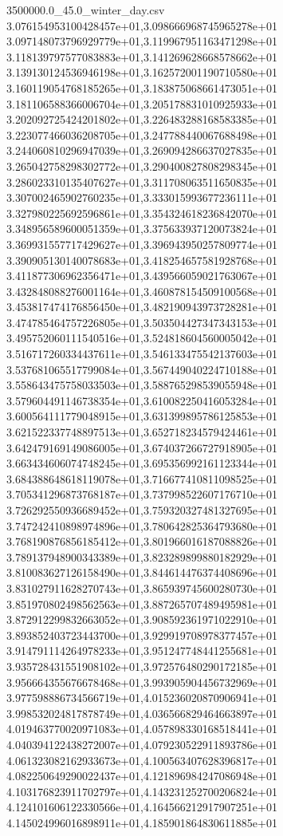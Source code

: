 \begin{filecontents*}{3500000.0_45.0_winter_day.csv}
3.076154953100428457e+01,3.098666968745965278e+01
3.097148073796929779e+01,3.119967951163471298e+01
3.118139797577083883e+01,3.141269628668578662e+01
3.139130124536946198e+01,3.162572001190710580e+01
3.160119054768185265e+01,3.183875068661473051e+01
3.181106588366006704e+01,3.205178831010925933e+01
3.202092725424201802e+01,3.226483288168583385e+01
3.223077466036208705e+01,3.247788440067688498e+01
3.244060810296947039e+01,3.269094286637027835e+01
3.265042758298302772e+01,3.290400827808298345e+01
3.286023310135407627e+01,3.311708063511650835e+01
3.307002465902760235e+01,3.333015993677236111e+01
3.327980225692596861e+01,3.354324618236842070e+01
3.348956589600051359e+01,3.375633937120073824e+01
3.369931557717429627e+01,3.396943950257809774e+01
3.390905130140078683e+01,3.418254657581928768e+01
3.411877306962356471e+01,3.439566059021763067e+01
3.432848088276001164e+01,3.460878154509100568e+01
3.453817474176856450e+01,3.482190943973728281e+01
3.474785464757226805e+01,3.503504427347343153e+01
3.495752060111540516e+01,3.524818604560005042e+01
3.516717260334437611e+01,3.546133475542137603e+01
3.537681065517799084e+01,3.567449040224710188e+01
3.558643475758033503e+01,3.588765298539055948e+01
3.579604491146738354e+01,3.610082250416053284e+01
3.600564111779048915e+01,3.631399895786125853e+01
3.621522337748897513e+01,3.652718234579424461e+01
3.642479169149086005e+01,3.674037266727918905e+01
3.663434606074748245e+01,3.695356992161123344e+01
3.684388648618119078e+01,3.716677410811098525e+01
3.705341296873768187e+01,3.737998522607176710e+01
3.726292550936689452e+01,3.759320327481327695e+01
3.747242410898974896e+01,3.780642825364793680e+01
3.768190876856185412e+01,3.801966016187088826e+01
3.789137948900343389e+01,3.823289899880182929e+01
3.810083627126158490e+01,3.844614476374408696e+01
3.831027911628270743e+01,3.865939745600280730e+01
3.851970802498562563e+01,3.887265707489495981e+01
3.872912299832663052e+01,3.908592361971022910e+01
3.893852403723443700e+01,3.929919708978377457e+01
3.914791114264978233e+01,3.951247748441255681e+01
3.935728431551908102e+01,3.972576480290172185e+01
3.956664355676678468e+01,3.993905904456732969e+01
3.977598886734566719e+01,4.015236020870906941e+01
3.998532024817878749e+01,4.036566829464663897e+01
4.019463770020971083e+01,4.057898330168518441e+01
4.040394122438272007e+01,4.079230522911893786e+01
4.061323082162933673e+01,4.100563407628396817e+01
4.082250649290022437e+01,4.121896984247086948e+01
4.103176823911702797e+01,4.143231252700206824e+01
4.124101606122330566e+01,4.164566212917907251e+01
4.145024996016898911e+01,4.185901864830611885e+01

\end{filecontents*}
